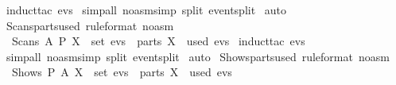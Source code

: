 \begin{isabellebody}
  \isadelimproof
  \endisadelimproof
  \isatagproof
  \isamarkupfalse%
  \ {\isacharparenleft}induct{\isacharunderscore}tac\ {\isachardoublequoteopen}evs{\isachardoublequoteclose}{\isacharparenright}\isanewline
  \isamarkupfalse%
  \ {\isacharparenleft}simp{\isacharunderscore}all\ {\isacharparenleft}no{\isacharunderscore}asm{\isacharunderscore}simp{\isacharparenright}\ split{\isacharcolon}\ event{\isachardot}split{\isacharparenright}\isanewline
  \isamarkupfalse%
  \ {\isacharparenleft}auto{\isacharparenright}\isanewline
  \isamarkupfalse%
  \endisatagproof
  {\isafoldproof}%
  \isadelimproof
  \isanewline
  \endisadelimproof
  \isanewline
  \isamarkupfalse%
  \ Scans{\isacharunderscore}parts{\isacharunderscore}used\ {\isacharbrackleft}rule{\isacharunderscore}format\ {\isacharparenleft}no{\isacharunderscore}asm{\isacharparenright}{\isacharbrackright}\ {\isacharcolon}\isanewline
  \ \ {\isachardoublequoteopen}Scans\ A\ P\ X\ {\isasymin}\ set\ evs\ {\isasymlongrightarrow}\ {\isacharparenleft}parts\ {\isacharbraceleft}X{\isacharbraceright}{\isacharparenright}\ {\isasymsubseteq}\ used\ evs{\isachardoublequoteclose}\isanewline
  \isadelimproof
  \endisadelimproof
  \isatagproof
  \isamarkupfalse%
  \ {\isacharparenleft}induct{\isacharunderscore}tac\ {\isachardoublequoteopen}evs{\isachardoublequoteclose}{\isacharparenright}\isanewline
  \isamarkupfalse%
  \ {\isacharparenleft}simp{\isacharunderscore}all\ {\isacharparenleft}no{\isacharunderscore}asm{\isacharunderscore}simp{\isacharparenright}\ split{\isacharcolon}\ event{\isachardot}split{\isacharparenright}\isanewline
  \isamarkupfalse%
  \ {\isacharparenleft}auto{\isacharparenright}\isanewline
  \isamarkupfalse%
  \endisatagproof
  {\isafoldproof}%
  \isadelimproof
  \isanewline
  \endisadelimproof
  \isanewline
  \isamarkupfalse%
  \ Shows{\isacharunderscore}parts{\isacharunderscore}used\ {\isacharbrackleft}rule{\isacharunderscore}format\ {\isacharparenleft}no{\isacharunderscore}asm{\isacharparenright}{\isacharbrackright}\ {\isacharcolon}\isanewline
  \ \ {\isachardoublequoteopen}Shows\ P\ A\ X\ {\isasymin}\ set\ evs\ {\isasymlongrightarrow}\ {\isacharparenleft}parts\ {\isacharbraceleft}X{\isacharbraceright}{\isacharparenright}\ {\isasymsubseteq}\ used\ evs{\isachardoublequoteclose}\isanewline
  \isadelimproof
  \endisadelimproof
  \isatagproof
  \isamarkupfalse%

\end{isabellebody}
